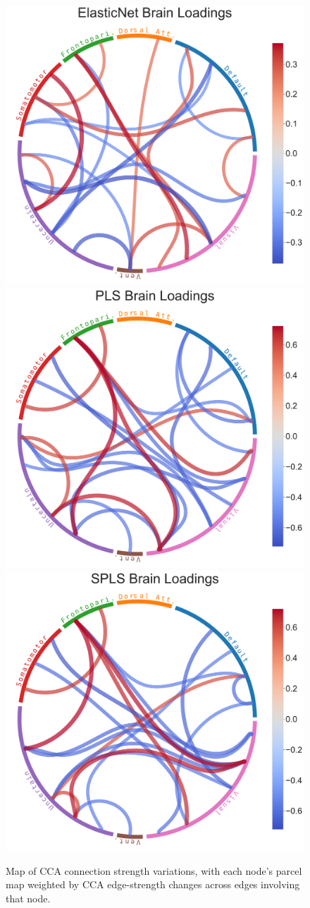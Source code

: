 \begin{figure}
\includegraphics[width=0.72\linewidth]{figures/regularization/hcp/ElasticNet brain loadings.pdf}
\includegraphics[width=0.72\linewidth]{figures/regularization/hcp/PLS brain loadings.pdf}
\includegraphics[width=0.72\linewidth]{figures/regularization/hcp/SPLS brain loadings.pdf}
\caption*{Map of CCA connection strength variations, with each node’s parcel map weighted by CCA edge-strength changes across edges involving that node.}
\label{fig:brain}
\end{figure}


